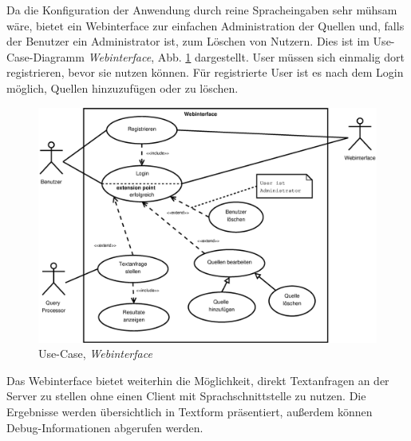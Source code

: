 \FloatBarrier

Da die Konfiguration der Anwendung durch reine Spracheingaben sehr mühsam wäre,
bietet \NewsGenie ein Webinterface zur einfachen Administration der Quellen und,
falls der Benutzer ein Administrator ist, zum Löschen von Nutzern. Dies ist im
Use-Case-Diagramm \textit{Webinterface}, Abb. \ref{uc-webinterface} dargestellt.
User müssen sich einmalig dort registrieren, bevor sie \NewsGenie nutzen können.
Für registrierte User ist es nach dem Login möglich, Quellen hinzuzufügen oder
zu löschen.

\begin{figure}[h]
\centering
\includegraphics[width=1\textwidth]{Pflichtenheft/03_produktuebersicht/webinterface}
\caption{Use-Case, \textit{Webinterface} \label{uc-webinterface}}
\end{figure}

\FloatBarrier

Das Webinterface bietet weiterhin die Möglichkeit, direkt Textanfragen an der
Server zu stellen ohne einen Client mit Sprachschnittstelle zu nutzen.
Die Ergebnisse werden übersichtlich in Textform präsentiert, außerdem können
Debug-Informationen abgerufen werden.

